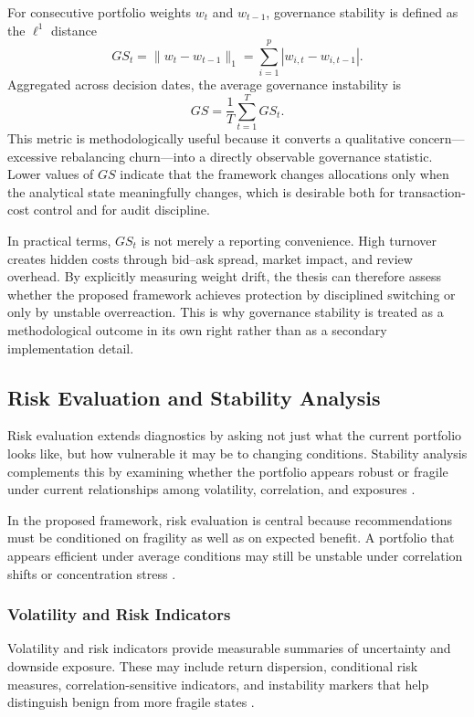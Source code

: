 \documentclass[11pt]{article}
\begin{document}
For consecutive portfolio weights $w_t$ and $w_{t-1}$, governance stability is defined as the $\ell^1$ distance
\begin{equation}
\label{eq:governance-stability}
GS_t = \lVert w_t - w_{t-1} \rVert_1 = \sum_{i=1}^{p} \left|w_{i,t} - w_{i,t-1}\right|.
\end{equation}
Aggregated across decision dates, the average governance instability is
\begin{equation}
\label{eq:avg-governance-stability}
GS = \frac{1}{T} \sum_{t=1}^{T} GS_t.
\end{equation}
This metric is methodologically useful because it converts a qualitative concern---excessive rebalancing churn---into a directly observable governance statistic. Lower values of $GS$ indicate that the framework changes allocations only when the analytical state meaningfully changes, which is desirable both for transaction-cost control and for audit discipline.

In practical terms, $GS_t$ is not merely a reporting convenience. High turnover creates hidden costs through bid--ask spread, market impact, and review overhead. By explicitly measuring weight drift, the thesis can therefore assess whether the proposed framework achieves protection by disciplined switching or only by unstable overreaction. This is why governance stability is treated as a methodological outcome in its own right rather than as a secondary implementation detail.

\subsection{Risk Evaluation and Stability Analysis}
Risk evaluation extends diagnostics by asking not just what the current portfolio looks like, but how vulnerable it may be to changing conditions. Stability analysis complements this by examining whether the portfolio appears robust or fragile under current relationships among volatility, correlation, and exposures \cite{cont2001,longin2001,billio2012}.

In the proposed framework, risk evaluation is central because recommendations must be conditioned on fragility as well as on expected benefit. A portfolio that appears efficient under average conditions may still be unstable under correlation shifts or concentration stress \cite{michaud1989,acemoglu2015}.

\subsubsection{Volatility and Risk Indicators}
Volatility and risk indicators provide measurable summaries of uncertainty and downside exposure. These may include return dispersion, conditional risk measures, correlation-sensitive indicators, and instability markers that help distinguish benign from more fragile states \cite{engle1982,bollerslev1986,rockafellar2002,zhu2009}.
\end{document}
